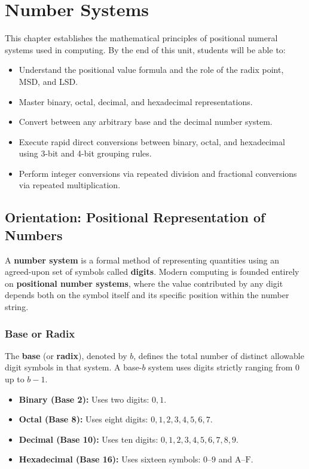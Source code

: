 \chapter{Number Systems}
\label{chap:number_systems}

\begin{tcolorbox}[enhanced, colback=boxnavybg, colframe=brandnavy, boxrule=1.2pt, arc=4pt, title={\Large\bfseries\sffamily Unit 4 Overview \& Learning Objectives}]
\sffamily\normalsize
This chapter establishes the mathematical principles of positional numeral systems used in computing. By the end of this unit, students will be able to:
\begin{itemize}[leftmargin=1.2em, itemsep=2pt, topsep=3pt]
    \item Understand the positional value formula and the role of the radix point, MSD, and LSD.
    \item Master binary, octal, decimal, and hexadecimal representations.
    \item Convert between any arbitrary base and the decimal number system.
    \item Execute rapid direct conversions between binary, octal, and hexadecimal using 3-bit and 4-bit grouping rules.
    \item Perform integer conversions via repeated division and fractional conversions via repeated multiplication.
\end{itemize}
\end{tcolorbox}

\section{Orientation: Positional Representation of Numbers}

A \textbf{number system} is a formal method of representing quantities using an agreed-upon set of symbols called \textbf{digits}. Modern computing is founded entirely on \textbf{positional number systems}, where the value contributed by any digit depends both on the symbol itself and its specific position within the number string.

\subsection{Base or Radix}
The \textbf{base} (or \textbf{radix}), denoted by $b$, defines the total number of distinct allowable digit symbols in that system. A base-$b$ system uses digits strictly ranging from $0$ up to $b-1$.
\begin{itemize}[leftmargin=1.2em]
    \item \textbf{Binary (Base 2):} Uses two digits: $0, 1$.
    \item \textbf{Octal (Base 8):} Uses eight digits: $0, 1, 2, 3, 4, 5, 6, 7$.
    \item \textbf{Decimal (Base 10):} Uses ten digits: $0, 1, 2, 3, 4, 5, 6, 7, 8, 9$.
    \item \textbf{Hexadecimal (Base 16):} Uses sixteen symbols: $0\text{--}9$ and $\text{A}\text{--}\text{F}$.
\end{itemize}

